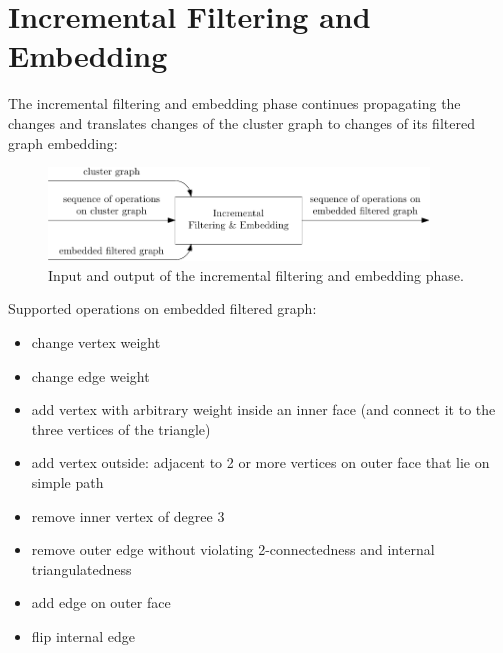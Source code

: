 \section{Incremental Filtering and Embedding}
\label{sect:incremental-filtering-and-embedding}

The incremental filtering and embedding phase continues propagating the changes and translates changes of the cluster graph to changes of its filtered graph embedding:

\begin{figure}[H]
	\centering\includegraphics[width=0.9\textwidth]{Resources/DynamicPipeline-IncrementalFilteringAndEmbedding.pdf}
	\caption{Input and output of the incremental filtering and embedding phase.}
	\label{fig:dynamic-pipeline-incremental-filtering-and-embedding}
\end{figure}

Supported operations on embedded filtered graph:
%
\begin{itemize}
	\item change vertex weight
	\item change edge weight
	\item add vertex with arbitrary weight inside an inner face (and connect it to the three vertices of the triangle)
	\item add vertex outside: adjacent to 2 or more vertices on outer face that lie on simple path
	\item remove inner vertex of degree 3
	\item remove outer edge without violating 2-connectedness and internal triangulatedness
	\item add edge on outer face
	\item flip internal edge
\end{itemize}
